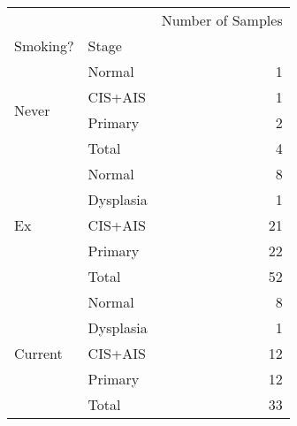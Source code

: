 \begin{tabular}{l|lr}
\toprule
        &       & Number of Samples \\
Smoking? & Stage &                   \\
\midrule
\multirow{4}{*}{Never} & Normal &                 1 \\
        & CIS+AIS &                 1 \\
        & Primary &                 2 \\
        & Total &                 4 \\
\cline{1-3}
\multirow{5}{*}{Ex} & Normal &                 8 \\
        & Dysplasia &                 1 \\
        & CIS+AIS &                21 \\
        & Primary &                22 \\
        & Total &                52 \\
\cline{1-3}
\multirow{5}{*}{Current} & Normal &                 8 \\
        & Dysplasia &                 1 \\
        & CIS+AIS &                12 \\
        & Primary &                12 \\
        & Total &                33 \\
\bottomrule
\end{tabular}

